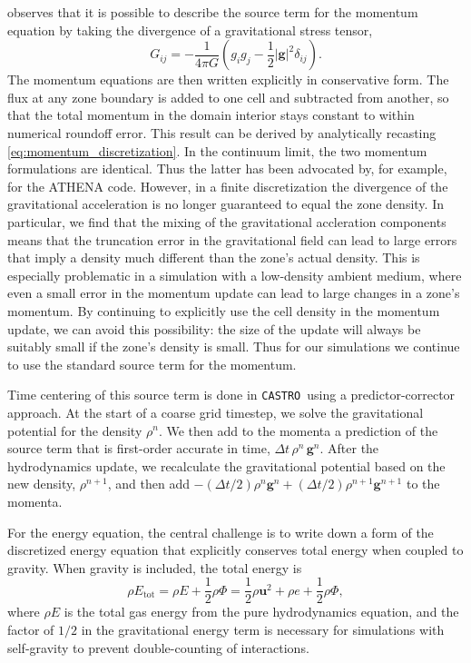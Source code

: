\documentclass[iop]{../emulateapj}
\newcommand{\castro}{\texttt{CASTRO}}
\begin{document}
\citet[Chapter 4]{shu:1992} observes that it is possible to describe the source term 
for the momentum equation by taking the divergence of a gravitational stress tensor,
\begin{equation}
  G_{ij} = -\frac{1}{4\pi G}\left(g_i g_j - \frac{1}{2}|\mathbf{g}|^2\delta_{ij}\right).
\end{equation}
The momentum equations are then written explicitly in conservative form.
The flux at any zone boundary is added to one cell and
subtracted from another, so that the total momentum in the domain interior stays constant to
within numerical roundoff error. This result can be derived by analytically recasting 
\autoref{eq:momentum_discretization}. In the continuum limit, the two momentum
formulations are identical. Thus the latter has been advocated by, for example, 
\cite{jiang:2013} for the ATHENA code. However, in a finite discretization 
the divergence of the gravitational acceleration is no longer guaranteed to equal
the zone density. In particular, we find that the mixing of the gravitational accleration components
means that the truncation error in the gravitational field can lead to large errors
that imply a density much different than the zone's actual density. This is especially
problematic in a simulation with a low-density ambient medium, where even a small error 
in the momentum update can lead to large changes in a zone's momentum. By continuing to explicitly
use the cell density in the momentum update, we can avoid this possibility: the size of the update
will always be suitably small if the zone's density is small. Thus for our simulations
we continue to use the standard source term for the momentum.

Time centering of this source term is done in \castro\ using a predictor-corrector approach.
At the start of a coarse grid timestep, we solve the gravitational potential for the density $\rho^n$.
We then add to the momenta a prediction of the source term that is first-order accurate in time, 
$\Delta t\, \rho^n\, \mathbf{g}^n$. After the hydrodynamics update, we recalculate
the gravitational potential based on the new density, $\rho^{n+1}$, and then add 
$-(\Delta t/2) \rho^n \mathbf{g}^n + (\Delta t/2) \rho^{n+1} \mathbf{g}^{n+1}$ to the momenta.

For the energy equation, the central challenge is to write down a form of the 
discretized energy equation that explicitly conserves total energy when 
coupled to gravity. When gravity is included, the total energy is
\begin{equation}
  \rho E_{\text{tot}} = \rho E + \frac{1}{2}\rho\Phi = \frac{1}{2}\rho \mathbf{u}^2 + \rho e + \frac{1}{2}\rho\Phi, \label{eq:total_energy_gravity}
\end{equation}
where $\rho E$ is the total gas energy from the pure hydrodynamics equation,
and the factor of $1/2$ in the gravitational energy term is necessary
for simulations with self-gravity to prevent double-counting of
interactions.
\end{document}
